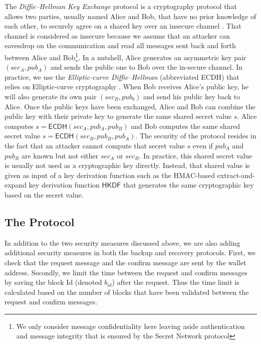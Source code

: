\documentclass[runningheads]{llncs}
\newcommand{\ms}[1]{\ensuremath{\mathsf{#1}}}
\begin{document}
The {\em Diffie–Hellman Key Exchange} protocol is a cryptography protocol that allows two parties, usually named Alice and Bob, that have no prior knowledge of each other, to securely agree on a shared key over an insecure channel \cite{diffie2022new}. That channel is considered as insecure because we assume that an attacker can eavesdrop on the communication and read all messages sent back and forth between Alice and Bob\footnote{We only consider message confidentiality here leaving aside authentication and message integrity that is ensured by the Secret Network protocol}. In a nutshell, Alice generates an asymmetric key pair $(sec_A, pub_A)$ and sends the public one to Bob over the in-secure channel. In practice, we use the {\em Elliptic-curve Diffie–Hellman} (abbreviated ECDH) that relies on Elliptic-curve cryptography \cite{bernstein2006curve25519}. When Bob receives Alice's public key, he will also generate its own pair $(sec_B, pub_b)$ and send his public key back to Alice. Once the public keys have been exchanged, Alice and Bob can combine the public key with their private key to generate the same shared secret value $s$. Alice computes $s=\ms{ECDH}(sec_A, pub_A, pub_B)$ and Bob computes the same shared secret value $s=\ms{ECDH}(sec_B, pub_B, pub_A)$. The security of the protocol resides in the fact that an attacker cannot compute that secret value $s$ even if $pub_A$ and $pub_B$ are known but not either $sec_A$ or $sec_B$. In practice, this shared secret value is usually not used as a cryptographic key directly. Instead, that shared value is given as input of a key derivation function such as the HMAC-based extract-and-expand key derivation function $\ms{HKDF}$ \cite{krawczyk2010hmac} that generates the same cryptographic key based on the secret value. 

\subsection{The Protocol}

In addition to the two security measures discussed above, we are also adding additional security measures in both the backup and recovery protocols. First, we check that the request message and the confirm message are sent by the wallet address. Secondly, we limit the time between the request and confirm messages by saving the block Id (denoted $b_{id}$) after the request. Thus the time limit is calculated based on the number of blocks that have been validated between the request and confirm messages.\\
\end{document}
